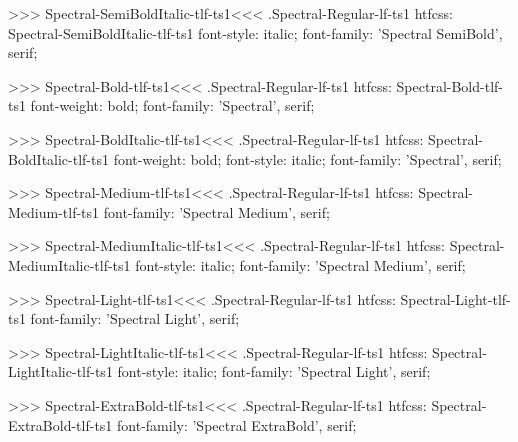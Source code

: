 >>>
\<Spectral-SemiBoldItalic-tlf-ts1\><<<
.Spectral-Regular-lf-ts1
htfcss:  Spectral-SemiBoldItalic-tlf-ts1  font-style: italic; font-family: 'Spectral SemiBold', serif;

>>>
\<Spectral-Bold-tlf-ts1\><<<
.Spectral-Regular-lf-ts1
htfcss:  Spectral-Bold-tlf-ts1  font-weight: bold; font-family: 'Spectral', serif;

>>>
\<Spectral-BoldItalic-tlf-ts1\><<<
.Spectral-Regular-lf-ts1
htfcss:  Spectral-BoldItalic-tlf-ts1  font-weight: bold; font-style: italic; font-family: 'Spectral', serif;

>>>
\<Spectral-Medium-tlf-ts1\><<<
.Spectral-Regular-lf-ts1
htfcss:  Spectral-Medium-tlf-ts1  font-family: 'Spectral Medium', serif;

>>>
\<Spectral-MediumItalic-tlf-ts1\><<<
.Spectral-Regular-lf-ts1
htfcss:  Spectral-MediumItalic-tlf-ts1  font-style: italic; font-family: 'Spectral Medium', serif;

>>>
\<Spectral-Light-tlf-ts1\><<<
.Spectral-Regular-lf-ts1
htfcss:  Spectral-Light-tlf-ts1  font-family: 'Spectral Light', serif;

>>>
\<Spectral-LightItalic-tlf-ts1\><<<
.Spectral-Regular-lf-ts1
htfcss:  Spectral-LightItalic-tlf-ts1  font-style: italic; font-family: 'Spectral Light', serif;

>>>
\<Spectral-ExtraBold-tlf-ts1\><<<
.Spectral-Regular-lf-ts1
htfcss:  Spectral-ExtraBold-tlf-ts1  font-family: 'Spectral ExtraBold', serif;

